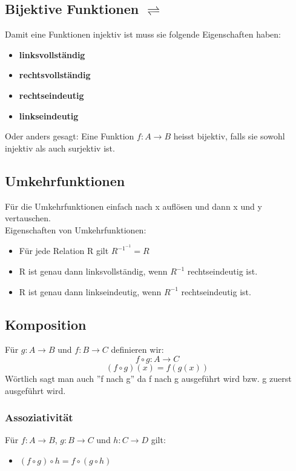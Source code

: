 \subsection{Bijektive Funktionen $\rightleftharpoons$}
Damit eine Funktionen injektiv ist muss sie folgende Eigenschaften haben:
\begin{itemize}
    \item \textbf{linksvollständig}
    \item \textbf{rechtsvollständig}
    \item \textbf{rechtseindeutig}
    \item \textbf{linkseindeutig}  
\end{itemize}
Oder anders gesagt: Eine Funktion $f : A \rightarrow B$ heisst bijektiv, 
falls sie sowohl injektiv als auch surjektiv ist.
\subsection{Umkehrfunktionen}
Für die Umkehrfunktionen einfach nach x auflösen und dann x und y vertauschen.\\
Eigenschaften von Umkehrfunktionen:
\begin{itemize}
    \item Für jede Relation R gilt $R^{-1^{-1}} = R$
    \item R ist genau dann linksvollständig, wenn $R^{-1}$ rechtseindeutig ist.
    \item R ist genau dann linkseindeutig, wenn $R^{-1}$ rechtseindeutig ist.
\end{itemize}
\subsection{Komposition}
Für $g: A \rightarrow B $ und $f: B \rightarrow C$ definieren wir:
\begin{equation}
    f \circ g: A \rightarrow C
\end{equation}
\begin{equation}
    (f \circ g)(x) = f(g(x))
\end{equation}
Wörtlich sagt man auch ''f nach g'' da f nach g ausgeführt wird bzw. g zuerst ausgeführt wird.
\subsubsection{Assoziativität}
Für $f: A \rightarrow B$, $g: B \rightarrow C$ und $h: C \rightarrow D$ gilt:
\begin{itemize}
    \item $(f \circ g) \circ h = f \circ (g \circ h)$
\end{itemize}

